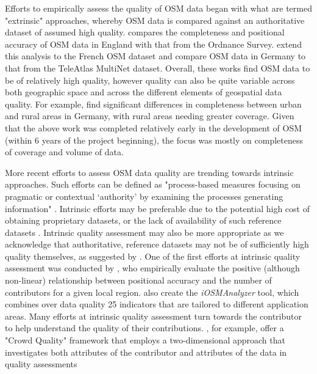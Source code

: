 Efforts to empirically assess the quality of OSM data began with what are termed "extrinsic" approaches, whereby OSM data is compared against an authoritative dataset of assumed high quality. \textcite{haklay_how_2010} compares the completeness and positional accuracy of OSM data in England with that from the Ordnance Survey. \textcite{girres_quality_2010} extend this analysis to the French OSM dataset and \textcite{zielstra_comparative_2010} compare OSM data in Germany to that from the TeleAtlas MultiNet dataset. Overall, these works find OSM data to be of relatively high quality, however quality can also be quite variable across both geographic space and across the different elements of geospatial data quality. For example, \textcite{zielstra_comparative_2010} find significant differences in completeness between urban and rural areas in Germany, with rural areas needing greater coverage. Given that the above work was completed relatively early in the development of OSM (within 6 years of the project beginning), the focus was mostly on completeness of coverage and volume of data.  

More recent efforts to assess OSM data quality are trending towards intrinsic approaches. Such efforts can be defined as "process-based measures focusing on pragmatic or contextual ‘authority’ by examining the processes generating information" \parencite[p. 297]{anderson_crowd_2018}. Intrinsic efforts may be preferable due to the potential high cost of obtaining proprietary datasets, or the lack of availability of such reference datasets \parencite{estes_maps_1994}. Intrinsic quality assessment may also be more appropriate as we acknowledge that authoritative, reference datasets may not be of sufficiently high quality themselves, as suggested by \textcite[p. 112]{goodchild_assuring_2012}. One of the first efforts at intrinsic quality assessment was conducted by \textcite{haklay_how_2010-1}, who empirically evaluate the positive (although non-linear) relationship between positional accuracy and the number of contributors for a given local region. \textcite{barron_comprehensive_2014} also create the \textit{iOSMAnalyzer} tool, which combines over data quality 25 indicators that are tailored to different application areas. Many efforts at intrinsic quality assessment turn towards the contributor to help understand the quality of their contributions. \textcite{van_exel_impact_2010}, for example, offer a "Crowd Quality" framework that employs a two-dimensional approach that investigates both attributes of the contributor and attributes of the data in quality assessments 

